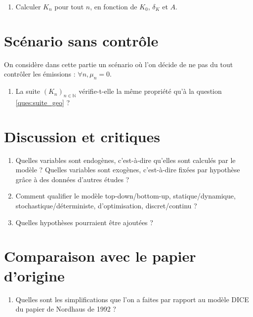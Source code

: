 \documentclass[12pt]{article}
\newcommand{\ques}[1]{\begin{enumerate}[resume]
\item  #1
\end{enumerate}}
\newcommand{\rep}[1]{\textit{Réponse :} #1 \\}
\renewcommand{\rep}[1]{ }
\theoremstyle{remark}
\def\NN{\mathbb{N}}
\begin{document}
\ques{Calculer $K_n$ pour tout $n$, en fonction de $K_0$, $\delta_K$ et $A$.}
\rep{\begin{equation*}
\forall n, \quad  K_n = K_0 \big(\frac{1- \delta_K}{1- 0,2373 A}\big)^n 
\end{equation*}}

\section{Scénario sans contrôle}
On considère dans cette partie un scénario où l'on décide de ne pas du tout contrôler les émissions : $\forall n, \mu_n=0$.
\ques{La suite $(K_n)_{n\in \NN}$ vérifie-t-elle la même propriété qu'à la question \ref{ques:suite_geo} ?}
\rep{Non, dans ce cas la suite $(T_n)_{n\in \NN}$, et donc la suite $(\Omega_n)_{n\in \NN}$, n'est pas constante et dépend de $(K_n)_{n\in \NN}$. La suite $(K_n)_{n\in \NN}$ n'est donc pas géométrique.}

\section{Discussion et critiques}
\begin{enumerate}[resume]
\item Quelles variables sont endogènes, c'est-à-dire qu'elles sont calculés par le modèle ? Quelles variables sont exogènes, c'est-à-dire fixées par hypothèse grâce à des données d'autres études ?
\item Comment qualifier le modèle top-down/bottom-up, statique/dynamique, stochastique/déterministe, d'optimisation, discret/continu ?
\item Quelles hypothèses pourraient être ajoutées ?
\end{enumerate}

\section{Comparaison avec le papier d'origine}
\begin{enumerate}[resume]
\item Quelles sont les simplifications que l'on a faites par rapport au modèle DICE du papier de Nordhaus de 1992 ?
\end{enumerate}
\end{document}
